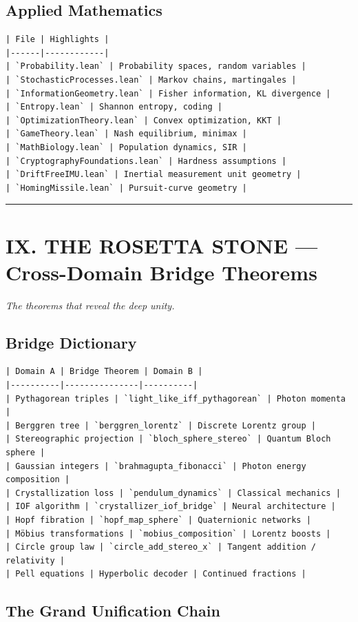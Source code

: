 \documentclass[12pt,a4paper,openany]{book}
\begin{document}
\subsection{Applied Mathematics}
\begin{verbatim}
| File | Highlights |
|------|------------|
| `Probability.lean` | Probability spaces, random variables |
| `StochasticProcesses.lean` | Markov chains, martingales |
| `InformationGeometry.lean` | Fisher information, KL divergence |
| `Entropy.lean` | Shannon entropy, coding |
| `OptimizationTheory.lean` | Convex optimization, KKT |
| `GameTheory.lean` | Nash equilibrium, minimax |
| `MathBiology.lean` | Population dynamics, SIR |
| `CryptographyFoundations.lean` | Hardness assumptions |
| `DriftFreeIMU.lean` | Inertial measurement unit geometry |
| `HomingMissile.lean` | Pursuit-curve geometry |
\end{verbatim}

\bigskip\hrule\bigskip

\section{IX. THE ROSETTA STONE — Cross-Domain Bridge Theorems}

\textit{The theorems that reveal the deep unity.}

\subsection{Bridge Dictionary}

\begin{verbatim}
| Domain A | Bridge Theorem | Domain B |
|----------|---------------|----------|
| Pythagorean triples | `light_like_iff_pythagorean` | Photon momenta |
| Berggren tree | `berggren_lorentz` | Discrete Lorentz group |
| Stereographic projection | `bloch_sphere_stereo` | Quantum Bloch sphere |
| Gaussian integers | `brahmagupta_fibonacci` | Photon energy composition |
| Crystallization loss | `pendulum_dynamics` | Classical mechanics |
| IOF algorithm | `crystallizer_iof_bridge` | Neural architecture |
| Hopf fibration | `hopf_map_sphere` | Quaternionic networks |
| Möbius transformations | `mobius_composition` | Lorentz boosts |
| Circle group law | `circle_add_stereo_x` | Tangent addition / relativity |
| Pell equations | Hyperbolic decoder | Continued fractions |
\end{verbatim}

\subsection{The Grand Unification Chain}
\end{document}
